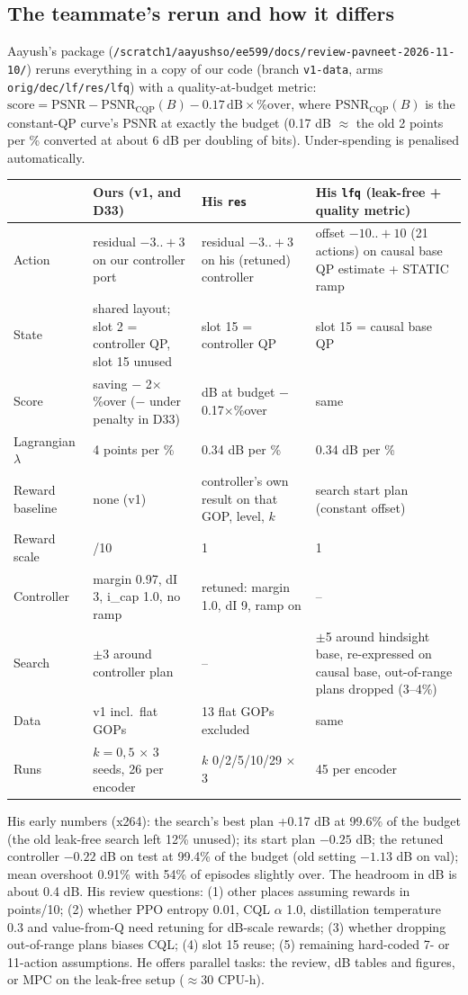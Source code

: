 \documentclass[10pt,a4paper]{article}
\newcommand{\code}[1]{\texttt{\small #1}}
\begin{document}
\subsection{The teammate's rerun and how it differs}
Aayush's package (\code{/scratch1/aayushso/ee599/docs/review-pavneet-2026-11-10/}) reruns everything in a copy of our
code (branch \code{v1-data}, arms \code{orig/dec/lf/res/lfq}) with a quality-at-budget metric:
$\text{score} = \text{PSNR} - \text{PSNR}_{\text{CQP}}(B) - 0.17\,\text{dB}\times\%\text{over}$, where
$\text{PSNR}_{\text{CQP}}(B)$ is the constant-QP curve's PSNR at exactly the budget (0.17 dB $\approx$ the old 2 points
per \% converted at about 6 dB per doubling of bits). Under-spending is penalised automatically.
\begin{center}\small
\begin{tabularx}{\linewidth}{lLLL}
\toprule
& Ours (v1, and D33) & His \code{res} & His \code{lfq} (leak-free + quality metric) \\\midrule
Action & residual $-3..+3$ on our controller port & residual $-3..+3$ on his (retuned) controller & offset $-10..+10$ (21 actions) on causal base QP estimate + STATIC ramp \\
State & shared layout; slot 2 = controller QP, slot 15 unused & slot 15 = controller QP & slot 15 = causal base QP \\
Score & saving $-$ 2$\times$\%over ($-$ under penalty in D33) & dB at budget $-$ 0.17$\times$\%over & same \\
Lagrangian $\lambda$ & 4 points per \% & 0.34 dB per \% & 0.34 dB per \% \\
Reward baseline & none (v1) & controller's own result on that GOP, level, $k$ & search start plan (constant offset) \\
Reward scale & /10 & 1 & 1 \\
Controller & margin 0.97, dI 3, i\_cap 1.0, no ramp & retuned: margin 1.0, dI 9, ramp on & -- \\
Search & $\pm$3 around controller plan & -- & $\pm$5 around hindsight base, re-expressed on causal base, out-of-range plans dropped (3--4\%) \\
Data & v1 incl.\ flat GOPs & 13 flat GOPs excluded & same \\
Runs & $k=0,5$ $\times$ 3 seeds, 26 per encoder & $k$ 0/2/5/10/29 $\times$ 3 & 45 per encoder \\
\bottomrule
\end{tabularx}
\end{center}
His early numbers (x264): the search's best plan +0.17 dB at 99.6\% of the budget (the old leak-free search left 12\%
unused); its start plan $-0.25$ dB; the retuned controller $-0.22$ dB on test at 99.4\% of the budget (old setting
$-1.13$ dB on val); mean overshoot 0.91\% with 54\% of episodes slightly over. The headroom in dB is about 0.4 dB.
His review questions: (1) other places assuming rewards in points/10; (2) whether PPO entropy 0.01, CQL $\alpha$ 1.0,
distillation temperature 0.3 and value-from-Q need retuning for dB-scale rewards; (3) whether dropping out-of-range
plans biases CQL; (4) slot 15 reuse; (5) remaining hard-coded 7- or 11-action assumptions. He offers parallel tasks:
the review, dB tables and figures, or MPC on the leak-free setup ($\approx$30 CPU-h).
\end{document}

